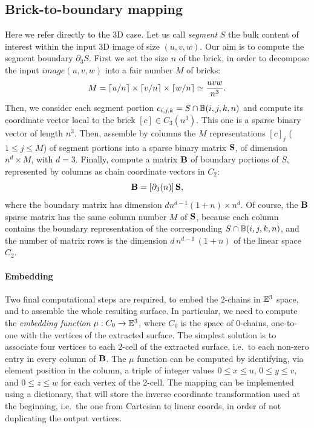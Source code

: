 \subsection{Brick-to-boundary mapping}\label{sec:brick-mapping}

Here we refer directly to the 3D case.
Let us call \emph{segment} $S$ the bulk content of interest within the input 3D image of size $(u,v,w)$. Our aim is to compute the segment boundary $\partial_3 S$. 
First we set the size $n$ of the brick, in order to decompose the input $image(u,v,w)$ into a fair number  $M$ of bricks:
\[
M = \left\lceil u/n \right\rceil \times \left\lceil v/n \right\rceil \times \left\lceil w/n \right\rceil \simeq \frac{uvw}{n^3}.
\] 
Then, we consider each segment portion $c_{i,j,k} = S \cap \mathbb{B}(i,j,k,n)$ and compute its coordinate vector local to the brick $[c]\in C_3(n^3)$. This one is a sparse binary vector of length $n^3$. Then, assemble by columns the $M$ representations $[c]_j$ ($1\leq j\leq M$) of segment portions into a sparse binary matrix ${\bf S}$, of dimension $n^d \times M$, with $d=3$. Finally, compute a matrix ${\bf \textbf{B}}$ of boundary portions of $S$, represented by columns as chain coordinate vectors in $C_2$:
\[
{\bf \textbf{B}} = [\partial_3(n)]\, {\bf S},
\]
where the boundary matrix has dimension $dn^{d-1}(1+n) \times n^d$.
Of course, the ${\bf \textbf{B}}$ sparse matrix has the same column number $M$ of ${\bf S}$, because each column contains the boundary representation of the corresponding $S \cap \mathbb{B}(i,j,k,n)$, and the number of matrix rows is the dimension $d\,n^{d-1}\,(1+n)$ of the linear space $C_2$.

\paragraph{Embedding}
Two final computational steps are required, to embed the 2-chains in $\mathbb{E}^3$ space, and to assemble the whole resulting surface. In particular, we need to compute the \emph{embedding function} $\mu : C_0 \to \mathbb{E}^3$, where $C_0$ is the space of 0-chains, one-to-one with the vertices of the extracted surface. The simplest solution is to associate  four vertices to each 2-cell of the extracted surface, i.e.~to each non-zero entry in every column of ${\bf \textbf{B}}$.  The $\mu$ function  can be computed by identifying, via  element position in the column, a triple of integer values $0\leq x\leq u$, $0\leq y\leq v$, and $0\leq z\leq w$ for each vertex of the 2-cell.  The mapping can be implemented using a dictionary, that will store the inverse coordinate transformation used at the beginning, i.e.~the one from Cartesian to linear coords, in order of not duplicating the output vertices.   


